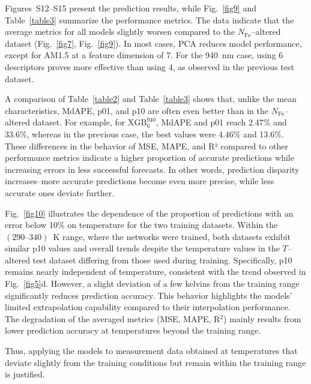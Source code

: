 \documentclass[a4paper,fleqn]{cas-sc}
\begin{document}
Figures~S12–S15 present the prediction results, while Fig.~\ref{fig9} and Table~\ref{table3} summarize the performance metrics. 
The data indicate that the average metrics for all models slightly worsen compared to the $N_\mathrm{Fe}$--altered dataset (Fig.~\ref{fig7}, Fig.~\ref{fig9}). 
In most cases, PCA reduces model performance, except for AM1.5 at a feature dimension of 7. 
For the 940~nm case, using 6 descriptors proves more effective than using 4, as observed in the previous test dataset.


A comparison of Table~\ref{table2} and Table~\ref{table3} shows that, unlike the mean characteristics, MdAPE, p01, and p10 are often even better than in the $N_\mathrm{Fe}$--altered dataset. 
For example, for $\mathrm{XGB}^\mathrm{940}_\mathrm{6}$, MdAPE and p01 reach 2.47\% and 33.6\%, whereas in the previous case, the best values were 4.46\% and 13.6\%. 
These differences in the behavior of MSE, MAPE, and R² compared to other performance metrics indicate a higher proportion of accurate predictions while increasing errors in less successful forecasts. 
In other words, prediction disparity increases--more accurate predictions become even more precise, while less accurate ones deviate further.


Fig.~\ref{fig10} illustrates the dependence of the proportion of predictions with an error below 10\% on temperature for the two training datasets. 
Within the $(290–340)$~K range, where the networks were trained, both datasets exhibit similar p10 values and overall trends despite the temperature values in the $T$--altered test dataset differing from those used during training. 
Specifically, p10 remains nearly independent of temperature, consistent with the trend observed in Fig.~\ref{fig5}d. 
However, a slight deviation of a few kelvins from the training range significantly reduces prediction accuracy. 
This behavior highlights the models' limited extrapolation capability compared to their interpolation performance. 
The degradation of the averaged metrics (MSE, MAPE, R$^{2}$) mainly results from lower prediction accuracy at temperatures beyond the training range. 


Thus, applying the models to measurement data obtained at temperatures that deviate slightly from the training conditions but remain within the training range is justified.
\end{document}
